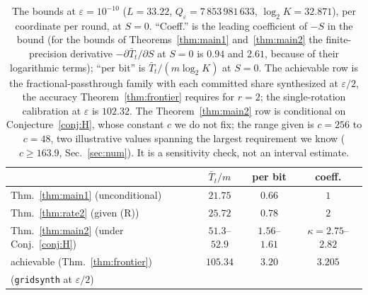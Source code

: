 \documentclass[aps,prx,twocolumn,superscriptaddress,nofootinbib,longbibliography]{revtex4-2}
\theoremstyle{plain}
\theoremstyle{definition}
\theoremstyle{remark}
\begin{document}
\begin{table}[t]
\centering\footnotesize
\caption{The bounds at $\varepsilon=10^{-10}$ ($L=33.22$, $Q_\varepsilon=7\,853\,981\,633$, $\log_2K=32.871$), per coordinate per round, at $S=0$. ``Coeff.'' is the leading coefficient of $-S$ in the bound (for the bounds of Theorems~\ref{thm:main1} and~\ref{thm:main2} the finite-precision derivative $-\partial\bar T_t/\partial S$ at $S=0$ is $0.94$ and $2.61$, because of their logarithmic terms); ``per bit'' is $\bar T_t/(m\log_2K)$ at $S=0$. The achievable row is the fractional-passthrough family with each committed share synthesized at $\varepsilon/2$, the accuracy Theorem~\ref{thm:frontier} requires for $r=2$; the single-rotation calibration at $\varepsilon$ is $102.32$. The Theorem~\ref{thm:main2} row is conditional on Conjecture~\ref{conj:H}, whose constant $c$ we do not fix; the range given is $c=256$ to $c=48$, two illustrative values spanning the largest requirement we know ($c\ge163.9$, Sec.~\ref{sec:num}). It is a sensitivity check, not an interval estimate.}
\label{tab:numbers}
\setlength{\tabcolsep}{4pt}\begin{tabular}{@{}l ccc@{}}
\toprule
& $\bar T_t/m$ & per bit & coeff.\\
\midrule
Thm.~\ref{thm:main1} (unconditional) & $21.75$ & $0.66$ & $1$\\
Thm.~\ref{thm:rate2} (given (R)) & $25.72$ & $0.78$ & $2$\\
Thm.~\ref{thm:main2} (under Conj.~\ref{conj:H}) & $51.3$--$52.9$ & $1.56$--$1.61$ & $\kappa=2.75$--$2.82$\\
achievable (Thm.~\ref{thm:frontier}) & $105.34$ & $3.20$ & $3.205$\\
\quad(\texttt{gridsynth} at $\varepsilon/2$) & & &\\
\bottomrule
\end{tabular}
\end{table}
\end{document}
